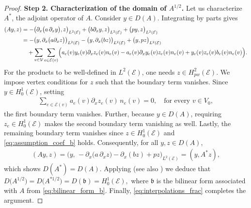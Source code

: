 \documentclass[a4paper, 10pt, english]{article}
\begin{document}
\begin{proof}
\smallbreak
\noindent
\textbf{Step 2. Characterization of the domain of $A^{1/2}$.}
Let us characterize $A^*$, the adjoint operator of $A$. Consider $y \in D(A)$. Integrating by parts gives
\begin{align*}
(Ay,z)
&=
-\bigl(\partial_x\bigl(a\,\partial_x y\bigr),z\bigr)_{L^2(\mathcal{E})}
+\bigl(b\partial_x y,z\bigr)_{L^2(\mathcal{E})}
+\bigl(py,z\bigr)_{L^2(\mathcal{E})}
\\
&=
-\bigl(y,\partial_x\bigl(a\partial_x z\bigr)\bigr)_{L^2(\mathcal{E})}
-
\bigl(y,\partial_x (bz)\bigr)_{L^2(\mathcal{E})}
+
\bigl(y,pz\bigr)_{L^2(\mathcal{E})}
\\
&\quad
+\sum_{v\in \mathcal V}
\sum_{e\in \mathcal{E}(v)}
\Bigl(
a_e(v)y_e(v)\partial_x z_e(v)n_e(v)
-
a_e(v)\partial_x y_e(v)z_e(v)n_e(v)+
y_e(v)z_e(v)b_e(v)n_e(v)
\Bigr).
\end{align*}
For the products to be well-defined in $L^2(\mathcal{E})$, one needs $z\in H^2_{pw}(\mathcal{E})$. We impose vertex conditions for $z$ such that the boundary term vanishes. Since $y\in H_0^1(\mathcal{E})$, setting 
\begin{align*}
\sum_{e\in \mathcal{E}(v)} a_e(v)\partial_x z_e(v)\,n_e(v) = 0,
\quad\text{for every }v\in V_0,
\end{align*}
the first boundary term vanishes. Further, because $y\in D(A)$, requiring $z_e\in H_0^1(\mathcal{E})$ makes the second boundary term vanishing as well. Lastly, the remaining boundary term vanishes since $z\in H_0^1(\mathcal{E})$ and \eqref{eq:assumption_coef_b} holds. Consequently, for all $y,z\in D(A)$,
\begin{align*}
(Ay,z)
=
\bigl(y,\,
- \partial_x\bigl(a\,\partial_x z\bigr)
- \partial_x (bz)
+ pz
\bigr)_{L^2(\mathcal{E})}
=
(y,A^*z),
\end{align*}
which shows $D(A^*) = D(A)$. Applying \cite[Theorem~8.2]{MR2124040} (see also \cite{Lions1962EspacesDE}) we deduce that $D\bigl(A^{1/2}\bigr)
=
D\bigl(A^{*1/2}\bigr)
=
D(\mathfrak{b})
=
H_0^1(\mathcal{E}),$ where $\mathfrak{b}$ is the bilinear form associated with $A$ from \eqref{eq:bilinear_form_b}. Finally, \eqref{eq:interpolations_frac} completes the argument.
\end{proof}
\end{document}
